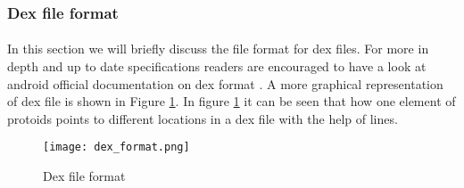 \documentclass[../main.tex]{subfile}
\begin{document}
			\subsubsection{Dex file format}
				\paragraph{} In this section we will briefly discuss the file format for dex files. For more in depth and up to date specifications readers are encouraged to have a look at android official documentation on dex format \cite{dex_format}. A more graphical representation of dex file is shown in Figure \ref{fig:dex_format}. In figure \ref{fig:dex_format} it can be seen that how one element of proto\textunderscore ids points to different locations in a dex file with the help of lines.
				\begin{figure}
					\texttt{[image: dex\_format.png]}
					\caption{Dex file format \cite{dex_image_albertini}}
					\label{fig:dex_format}
				\end{figure}
\end{document}

